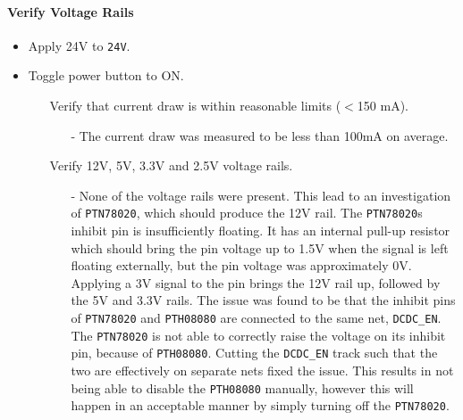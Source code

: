 \paragraph{Verify Voltage Rails} %
\label{par:verify_voltage_rails}

\begin{itemize}
 	\item Apply 24V to \texttt{24V}.
 	\item Toggle power button to ON.
 	\begin{itemize}
 		\item[\cmark] Verify that current draw is within reasonable limits ($<$150 mA).
 			\begin{itemize}
 				\item[-] The current draw was measured to be less than 100mA on average. 
 			\end{itemize}
 		\item[\xmark] Verify 12V, 5V, 3.3V and 2.5V voltage rails.
 			\begin{itemize}
 				\item[-] None of the voltage rails were present.
 				This lead to an investigation of \texttt{PTN78020}, which should produce the 12V rail. 
 				The \texttt{PTN78020}s inhibit pin is insufficiently floating.
 				It has an internal pull-up resistor which should bring the pin voltage up to 1.5V when the signal is left floating externally, but the pin voltage was approximately 0V.
 				Applying a 3V signal to the pin brings the 12V rail up, followed by the 5V and 3.3V rails.
 				The issue was found to be that the inhibit pins of \texttt{PTN78020} and \texttt{PTH08080} are connected to the same net, \texttt{DCDC\_EN}.
 				The \texttt{PTN78020} is not able to correctly raise the voltage on its inhibit pin, because of \texttt{PTH08080}. 
 				Cutting the \texttt{DCDC\_EN} track such that the two are effectively on separate nets fixed the issue.
            	This results in not being able to disable the \texttt{PTH08080} manually, however this will happen in an acceptable manner by simply turning off the \texttt{PTN78020}.
 			\end{itemize}
 	\end{itemize}
 \end{itemize}

